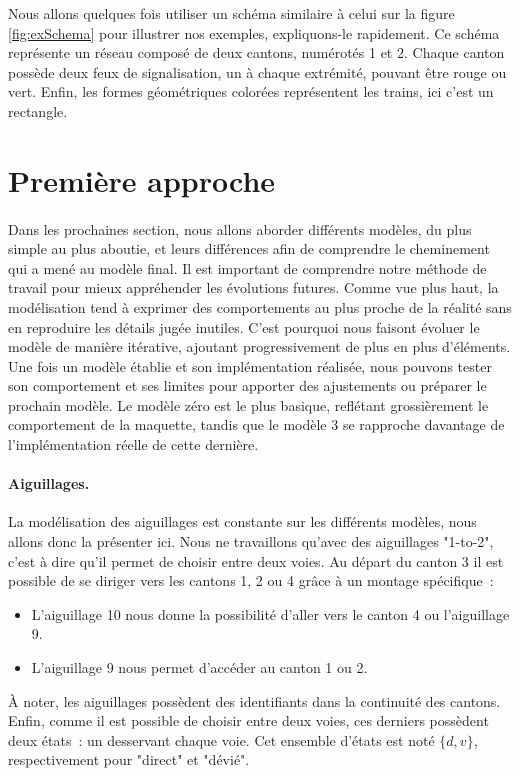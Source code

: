 \documentclass[oneside, a4paper, 11pt]{book}
\begin{document}
Nous allons quelques fois utiliser un schéma similaire à celui sur la figure \ref{fig:exSchema} pour illustrer nos exemples, expliquons-le rapidement.
Ce schéma représente un réseau composé de deux cantons, numérotés 1 et 2. Chaque canton possède deux feux de signalisation, un à chaque extrémité, pouvant être rouge ou vert. Enfin, les formes géométriques colorées représentent les trains, ici c'est un rectangle.

\section{Première approche}

\paragraph{} 
Dans les prochaines section, nous allons aborder différents modèles, du plus simple au plus aboutie, et leurs différences afin de comprendre le cheminement qui a mené au modèle final. Il est important de comprendre notre méthode de travail pour mieux appréhender les évolutions futures.
Comme vue plus haut, la modélisation tend à exprimer des comportements au plus proche de la réalité sans en reproduire les détails jugée inutiles.
C'est pourquoi nous faisont évoluer le modèle de manière itérative, ajoutant progressivement de plus en plus d'éléments.
Une fois un modèle établie et son implémentation réalisée, nous pouvons tester son comportement et ses limites pour apporter des ajustements ou préparer le prochain modèle.
Le modèle zéro est le plus basique, reflétant grossièrement le comportement de la maquette, tandis que le modèle 3 se rapproche davantage de l'implémentation réelle de cette dernière.

\paragraph{Aiguillages.}
La modélisation des aiguillages est constante sur les différents modèles, nous allons donc la présenter ici. Nous ne travaillons qu'avec des aiguillages "1-to-2", c'est à dire qu'il permet de choisir entre deux voies.
Au départ du canton 3 il est possible de se diriger vers les cantons 1, 2 ou 4 grâce à un montage spécifique~: 
\begin{itemize}
	\item L'aiguillage 10 nous donne la possibilité d'aller vers le canton 4 ou l'aiguillage 9.
	\item L'aiguillage 9 nous permet d'accéder au canton 1 ou 2.
\end{itemize}
À noter, les aiguillages possèdent des identifiants dans la continuité des cantons.
Enfin, comme il est possible de choisir entre deux voies, ces derniers possèdent deux états~: un desservant chaque voie. Cet ensemble d'états est noté $\{d,v\}$, respectivement pour "direct" et "dévié". 
\end{document}
